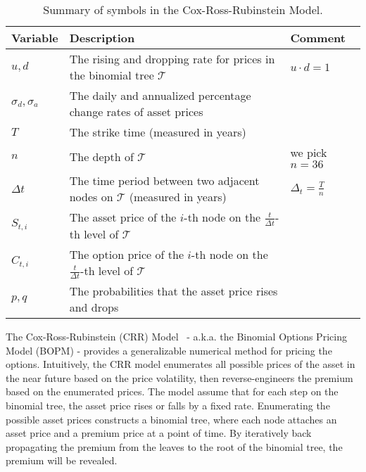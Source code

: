 \renewcommand{\arraystretch}{1.2}
\begin{table}[]
\caption{Summary of symbols in the Cox-Ross-Rubinstein Model.}
\label{table:summary_symbols_crr}
\footnotesize
\begin{tabular}{|p{1cm}|p{4cm}|p{1.5cm}|}
\hline
Variable             & Description                                                                               & Comment                  \\\hline
$u, d$               & The rising and dropping rate for prices in the binomial tree $\mathcal{T}$                & $u \cdot d = 1$          \\\hline
$\sigma_d, \sigma_a$ & The daily and annualized percentage change rates of asset prices                          &                          \\\hline
$T$                  & The strike time (measured in years)                                                       &                          \\\hline
$n$                  & The depth of $\mathcal{T}$                                                                & we pick $n = 36$         \\\hline
$\Delta t$           & The time period between two adjacent nodes on $\mathcal{T}$ (measured in years)           & $\Delta_t = \frac{T}{n}$ \\\hline
$S_{t, i}$           & The asset price of the $i$-th node on the $\frac{t}{\Delta t}$-th level of $\mathcal{T}$  &                          \\\hline
$C_{t, i}$           & The option price of the $i$-th node on the $\frac{t}{\Delta t}$-th level of $\mathcal{T}$ &                          \\\hline
$p, q$               & The probabilities that the asset price rises and drops                                    &                          \\\hline
\end{tabular}%

\end{table}



The Cox-Ross-Rubinstein (CRR) Model~\cite{cox1979option} - a.k.a. the Binomial Options Pricing Model (BOPM) - provides a generalizable numerical method for pricing the options.
Intuitively, the CRR model enumerates all possible prices of the asset in the near future based on the price volatility,
then reverse-engineers the premium based on the enumerated prices.
The model assume that for each step on the binomial tree, the asset price rises or falls by a fixed rate.
Enumerating the possible asset prices constructs a binomial tree, where each node attaches an asset price and a premium price at a point of time.
By iteratively back propagating the premium from the leaves to the root of the binomial tree, the premium will be revealed.

